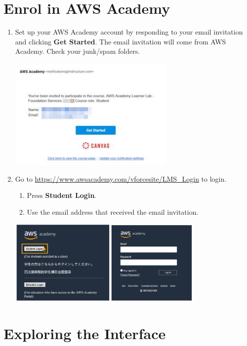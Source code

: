 \documentclass{csse4400}
\begin{document}
\section{Enrol in AWS Academy}

\begin{enumerate}
    \item
        Set up your AWS Academy account by responding to your email invitation and clicking \textbf{Get Started}.
        The email invitation will come from AWS Academy.
        Check your junk/spam folders.

        \includegraphics{images/email-invite}

    \item Go to \url{https://www.awsacademy.com/vforcesite/LMS_Login} to login.
    \begin{enumerate}
        \item Press \textbf{Student Login}.
        \item Use the email address that received the email invitation.
    \end{enumerate}

    \includegraphics[width=0.75\textwidth]{images/labs-login}
\end{enumerate}


\section{Exploring the Interface}
\end{document}
